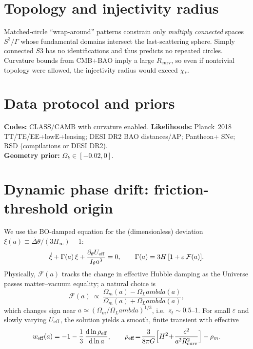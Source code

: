 \documentclass[twocolumn,aps,prd,showpacs,nofootinbib,superscriptaddress]{revtex4-2}
\def\Sthree{S3}%
\def\Lambda{Lambda}%
\newcommand{\Sthree}{S^{3}}
\newcommand{\Omk}{\Omega_k}
\newcommand{\dd}{\mathrm{d}}
\newcommand{\chis}{\chi_{\ast}} %
\newcommand{\Rcurv}{R_{\mathrm{curv}}}
\begin{document}
\section{Topology and injectivity radius}
\label{sec:topology}
Matched-circle ``wrap-around'' patterns constrain only \emph{multiply connected} spaces $S^3/\Gamma$ whose fundamental domains intersect the last-scattering sphere. Simply connected $\Sthree$ has no identifications and thus predicts no repeated circles. Curvature bounds from CMB+BAO imply a large $\Rcurv$, so even if nontrivial topology were allowed, the injectivity radius would exceed $\chis$.

\section{Data protocol and priors}
\label{sec:protocol}
\textbf{Codes:} CLASS/CAMB with curvature enabled. 
\textbf{Likelihoods:} Planck~2018 TT/TE/EE+lowE+lensing; DESI DR2 BAO distances/AP; Pantheon+ SNe; RSD (compilations or DESI DR2).\\
\textbf{Geometry prior:} $\Omk \in [-0.02,0]$. 

\section{Dynamic phase drift: friction-threshold origin}
\label{sec:drift}
We use the BO-damped equation for the (dimensionless) deviation $\xi(a)\equiv \dot{\Delta\theta}/(3H_\infty)-1$:
\begin{equation}\label{eq:friction}
\dot{\xi} + \Gamma(a)\,\xi + \frac{\partial_\theta U_{\rm eff}}{I_\theta a^3}=0,\qquad \Gamma(a)=3H\,[1+\varepsilon\,\mathcal{F}(a)].
\end{equation}
Physically, $\mathcal{F}(a)$ tracks the change in effective Hubble damping as the Universe passes matter--vacuum equality; a natural choice is
\begin{equation}
\mathcal{F}(a)\ \propto\ \frac{\Omega_m(a)-\Omega_\Lambda(a)}{\Omega_m(a)+\Omega_\Lambda(a)},
\end{equation}
which changes sign near $a\simeq (\Omega_m/\Omega_\Lambda)^{1/3}$, i.e.\ $z_t\sim 0.5$--$1$.
For small $\varepsilon$ and slowly varying $U_{\rm eff}$, the solution yields a smooth, finite transient with effective
\begin{equation}
w_{\rm eff}(a) = -1 - \frac{1}{3}\,\frac{\dd\ln\rho_{\rm eff}}{\dd\ln a},\qquad
\rho_{\rm eff}\!=\!\frac{3}{8\pi G}\Big[H^2\!+\!\frac{c^2}{a^2\Rcurv^2}\Big]-\rho_m.
\end{equation}
\end{document}
